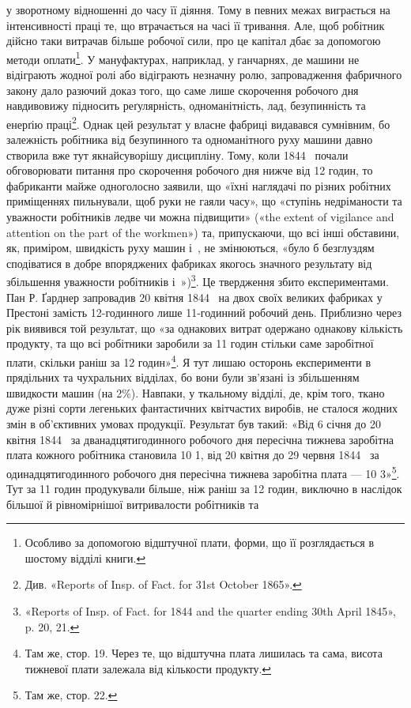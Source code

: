 \parcont{}  %
у зворотному відношенні до часу її діяння. Тому в певних межах
виграється на інтенсивності праці те, що втрачається на часі її
тривання. Але, щоб робітник дійсно таки витрачав більше робочої
сили, про це капітал дбає за допомогою методи оплати\footnote{
Особливо за допомогою відштучної плати, форми, що її розглядається
в шостому відділі книги.
}. У мануфактурах,
наприклад, у ганчарнях, де машини не відіграють
жодної ролі або відіграють незначну ролю, запровадження фабричного
закону дало разючий доказ того, що саме лише скорочення
робочого дня навдивовижу підносить реґулярність, одноманітність,
лад, безупинність та енерґію праці\footnote{
Див. «Reports of Insp. of Fact. for 31st October 1865».
}. Однак цей результат
у власне фабриці видавався сумнівним, бо залежність робітника
від безупинного та одноманітного руху машини давно створила
вже тут якнайсуворішу дисципліну. Тому, коли 1844~
почали обговорювати питання про скорочення робочого дня
нижче від 12 годин, то фабриканти майже одноголосно заявили,
що «їхні наглядачі по різних робітних приміщеннях пильнували,
щоб руки не гаяли часу», що «ступінь недріманости та уважности
робітників ледве чи можна підвищити» («the extent of vigilance
and attention on the part of the workmen») та, припускаючи, що всі
інші обставини, як, приміром, швидкість руху машин і~,
не змінюються, «було б безглуздям сподіватися в добре впоряджених
фабриках якогось значного результату від збільшення
уважности робітників і~»)\footnote{
«Reports of Insp. of Fact. for 1844 and the quarter ending 30th
April 1845», p. 20, 21.
}. Це твердження збито експериментами.
Пан Р. Ґарднер запровадив 20 квітня 1844~ на двох
своїх великих фабриках у Престоні замість 12-годинного лише
11-годинний робочий день. Приблизно через рік виявився
той результат, що «за однакових витрат одержано однакову
кількість продукту, та що всі робітники заробили за 11 годин
стільки саме заробітної плати, скільки раніш за 12 годин»\footnote{
Там же, стор. 19. Через те, що відштучна плата лишилась та
сама, висота тижневої плати залежала від кількости продукту.
}.
Я тут лишаю осторонь експерименти в прядільних та чухральних
відділах, бо вони були зв’язані із збільшенням швидкости машин
(на 2\%). Навпаки, у ткальному відділі, де, крім того, ткано
дуже різні сорти легеньких фантастичних квітчастих виробів,
не сталося жодних змін в об’єктивних умовах продукції. Результат
був такий: «Від 6 січня до 20 квітня 1844~ за дванадцятигодинного
робочого дня пересічна тижнева заробітна плата кожного
робітника становила 10 1, від 20 квітня до
29 червня 1844~ за одинадцятигодинного робочого дня пересічна
тижнева заробітна плата — 10 3»\footnote{
Там же, стор. 22.
}. Тут за
11 годин продукували більше, ніж раніш за 12 годин, виключно
в наслідок більшої й рівномірнішої витривалости робітників та
\parbreak{}  %

